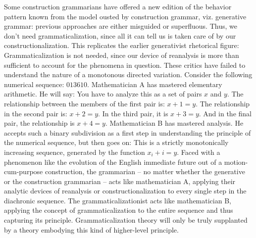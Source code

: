 Some construction grammarians have offered a new edition of the behavior pattern known from the model ousted by construction grammar, viz. generative grammar: previous approaches are either misguided or superfluous. Thus, we don’t need grammaticalization, since all it can tell us is taken care of by our constructionalization. This replicates the earlier generativist rhetorical figure: Grammaticalization is not needed, since our device of reanalysis is more than sufficient to account for the phenomena in question. These critics have failed to understand the nature of a monotonous directed variation. Consider the following numerical sequence: $0 1 3 6 10$. Mathematician A has mastered elementary arithmetic. He will say: You have to analyze this as a set of pairs $x$ and $y$. The relationship between the members of the first pair is: $x+1=y$. The relationship in the second pair is: $x+2=y$. In the third pair, it is $x+3=y$. And in the final pair, the relationship is $x+4=y$. Mathematician B has mastered analysis. He accepts such a binary subdivision as a first step in understanding the principle of the numerical sequence, but then goes on: This is a strictly monotonically increasing sequence, generated by the function $x_i+i=y$. Faced with a phenomenon like the evolution of the English immediate future out of a motion-cum-purpose construction, the grammarian – no matter whether the generative or the construction grammarian – acts like mathematician A, applying their analytic devices of reanalysis or constructionalization to every single step in the diachronic sequence. The grammaticalizationist acts like mathematician B, applying the concept of grammaticalization to the entire sequence and thus capturing its principle. Grammaticalization theory will only be truly supplanted by a theory embodying this kind of higher-level principle.
